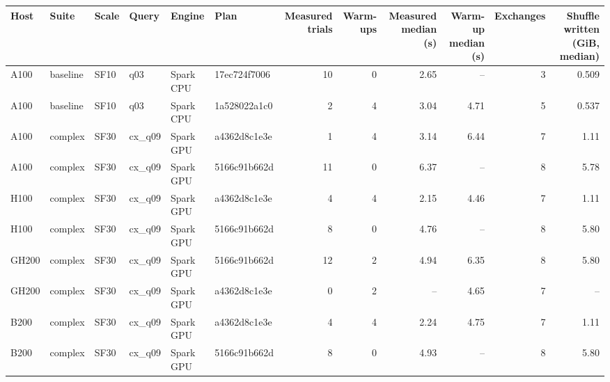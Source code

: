\begin{longtable}{llllllrrrrrr}
\toprule
Host & Suite & Scale & Query & Engine & Plan & Measured trials & Warm-ups & Measured median (s) & Warm-up median (s) & Exchanges & Shuffle written (GiB, median) \\
\midrule
\endhead
\bottomrule
\endfoot
A100 & baseline & SF10 & q03 & Spark CPU & 17ec724f7006 & 10 & 0 & 2.65 & -- & 3 & 0.509 \\
A100 & baseline & SF10 & q03 & Spark CPU & 1a528022a1c0 & 2 & 4 & 3.04 & 4.71 & 5 & 0.537 \\
A100 & complex & SF30 & cx\_q09 & Spark GPU & a4362d8c1e3e & 1 & 4 & 3.14 & 6.44 & 7 & 1.11 \\
A100 & complex & SF30 & cx\_q09 & Spark GPU & 5166c91b662d & 11 & 0 & 6.37 & -- & 8 & 5.78 \\
H100 & complex & SF30 & cx\_q09 & Spark GPU & a4362d8c1e3e & 4 & 4 & 2.15 & 4.46 & 7 & 1.11 \\
H100 & complex & SF30 & cx\_q09 & Spark GPU & 5166c91b662d & 8 & 0 & 4.76 & -- & 8 & 5.80 \\
GH200 & complex & SF30 & cx\_q09 & Spark GPU & 5166c91b662d & 12 & 2 & 4.94 & 6.35 & 8 & 5.80 \\
GH200 & complex & SF30 & cx\_q09 & Spark GPU & a4362d8c1e3e & 0 & 2 & -- & 4.65 & 7 & -- \\
B200 & complex & SF30 & cx\_q09 & Spark GPU & a4362d8c1e3e & 4 & 4 & 2.24 & 4.75 & 7 & 1.11 \\
B200 & complex & SF30 & cx\_q09 & Spark GPU & 5166c91b662d & 8 & 0 & 4.93 & -- & 8 & 5.80 \\
\end{longtable}
